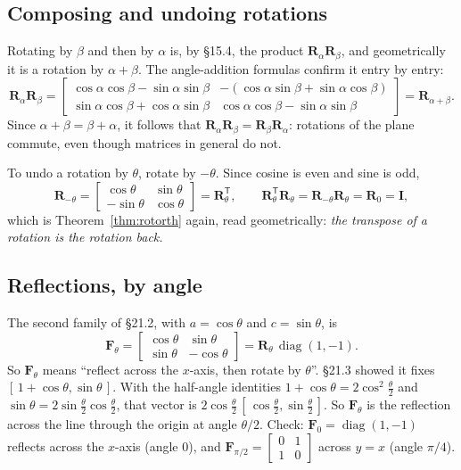 \documentclass[11pt]{article}
\theoremstyle{plain}
\theoremstyle{definition}
\theoremstyle{remark}
\newcommand{\mt}[1]{\mathbf{#1}}
\newcommand{\T}{^{\mathsf{T}}}
\DeclareMathOperator{\diagop}{diag}
\begin{document}
\subsection{Composing and undoing rotations}
Rotating by $\beta$ and then by $\alpha$ is, by \S15.4, the product
$\mt{R}_\alpha\mt{R}_\beta$, and geometrically it is a rotation by
$\alpha+\beta$. The angle-addition formulas confirm it entry by entry:
\[
  \mt{R}_\alpha\mt{R}_\beta
  =\begin{bmatrix}\cos\alpha\cos\beta-\sin\alpha\sin\beta & -(\cos\alpha\sin\beta+\sin\alpha\cos\beta)\\
                  \sin\alpha\cos\beta+\cos\alpha\sin\beta & \cos\alpha\cos\beta-\sin\alpha\sin\beta\end{bmatrix}
  =\mt{R}_{\alpha+\beta}.
\]
Since $\alpha+\beta=\beta+\alpha$, it follows that
$\mt{R}_\alpha\mt{R}_\beta=\mt{R}_\beta\mt{R}_\alpha$: rotations of the plane
commute, even though matrices in general do not.

To undo a rotation by $\theta$, rotate by $-\theta$. Since cosine is even and
sine is odd,
\[
  \mt{R}_{-\theta}
  =\begin{bmatrix}\cos\theta&\sin\theta\\-\sin\theta&\cos\theta\end{bmatrix}
  =\mt{R}_\theta\T,
  \qquad
  \mt{R}_\theta\T\mt{R}_\theta=\mt{R}_{-\theta}\mt{R}_\theta=\mt{R}_0=\mt{I},
\]
which is Theorem~\ref{thm:rotorth} again, read geometrically: \emph{the
transpose of a rotation is the rotation back.}

\subsection{Reflections, by angle}
The second family of \S21.2, with $a=\cos\theta$ and $c=\sin\theta$, is
\[
  \mt{F}_\theta=\begin{bmatrix}\cos\theta&\sin\theta\\\sin\theta&-\cos\theta\end{bmatrix}
  =\mt{R}_\theta\,\diagop(1,-1).
\]
So $\mt{F}_\theta$ means ``reflect across the $x$-axis, then rotate by
$\theta$''. \S21.3 showed it fixes $[\,1+\cos\theta,\sin\theta\,]$. With the
half-angle identities $1+\cos\theta=2\cos^{2}\frac{\theta}{2}$ and
$\sin\theta=2\sin\frac{\theta}{2}\cos\frac{\theta}{2}$, that vector is
$2\cos\frac{\theta}{2}\,[\,\cos\frac{\theta}{2},\sin\frac{\theta}{2}\,]$. So
$\mt{F}_\theta$ is the reflection across the line through the origin at angle
$\theta/2$. Check: $\mt{F}_0=\diagop(1,-1)$ reflects across the $x$-axis (angle
$0$), and $\mt{F}_{\pi/2}=\begin{bmatrix}0&1\\1&0\end{bmatrix}$ across $y=x$
(angle $\pi/4$).
\end{document}
